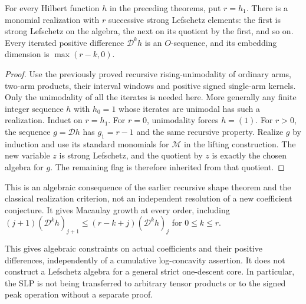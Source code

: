 \begin{corollary}
For every Hilbert function $h$ in the preceding theorems,
put $r=h_1$. There is a monomial realization with $r$
successive strong Lefschetz elements: the first is strong
Lefschetz on the algebra, the next on its quotient by the
first, and so on. Every iterated positive difference
$\mathcal D^k h$ is an $O$-sequence, and its embedding
dimension is $\max(r-k,0)$.
\end{corollary}
\begin{proof}
Use the previously proved recursive rising-unimodality of
ordinary arms, two-arm products, their interval windows and
positive signed single-arm kernels. Only the unimodality of
all the iterates is needed here. More generally any finite
integer sequence $h$ with $h_0=1$ whose iterates are unimodal
has such a realization. Induct on $r=h_1$. For $r=0$,
unimodality forces $h=(1)$. For $r>0$, the sequence
$g=\mathcal D h$ has $g_1=r-1$ and the same recursive
property. Realize $g$ by induction and use its standard
monomials for $\mathcal M$ in the lifting construction.
The new variable $z$ is strong Lefschetz, and the quotient
by $z$ is exactly the chosen algebra for $g$. The remaining
flag is therefore inherited from that quotient.
\end{proof}

This is an algebraic consequence of the earlier recursive
shape theorem and the classical realization criterion, not
an independent resolution of a new coefficient conjecture.
It gives Macaulay growth at every order, including
$(j+1)(\mathcal D^k h)_{j+1}\le(r-k+j)(\mathcal D^k h)_j$
for $0\le k\le r$.

This gives algebraic constraints on actual coefficients and
their positive differences, independently of a cumulative
log-concavity assertion. It does not construct a Lefschetz
algebra for a general strict one-descent core. In particular,
the SLP is not being transferred to arbitrary tensor products
or to the signed peak operation without a separate proof.
